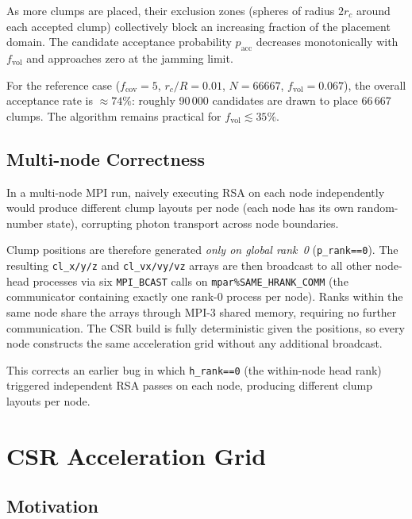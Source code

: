 \documentclass[english,a4paper]{my_memo}
\begin{document}
As more clumps are placed, their exclusion zones (spheres of radius $2r_c$
around each accepted clump) collectively block an increasing fraction of the
placement domain.  The candidate acceptance probability $p_\mathrm{acc}$
decreases monotonically with $f_\mathrm{vol}$ and approaches zero at the
jamming limit.

For the reference case ($f_\mathrm{cov}=5$, $r_c/R=0.01$, $N=66667$,
$f_\mathrm{vol}=0.067$), the overall acceptance rate is $\approx 74\%$:
roughly 90\,000 candidates are drawn to place 66\,667 clumps.  The algorithm
remains practical for $f_\mathrm{vol} \lesssim 35\%$.

\subsection{Multi-node Correctness}

In a multi-node MPI run, naively executing RSA on each node independently
would produce different clump layouts per node (each node has its own
random-number state), corrupting photon transport across node boundaries.

\begin{sloppypar}
Clump positions are therefore generated \emph{only on global rank~0}
(\texttt{p\_rank==0}).  The resulting \texttt{cl\_x/y/z} and
\texttt{cl\_vx/vy/vz} arrays are then broadcast to all other node-head
processes via six \texttt{MPI\_BCAST} calls on
\texttt{mpar\%SAME\_HRANK\_COMM} (the communicator containing exactly one
rank-0 process per node).  Ranks within the same node share the arrays
through MPI-3 shared memory, requiring no further communication.  The CSR
build is fully deterministic given the positions, so every node constructs
the same acceleration grid without any additional broadcast.
\end{sloppypar}

This corrects an earlier bug in which \texttt{h\_rank==0} (the within-node
head rank) triggered independent RSA passes on each node, producing different
clump layouts per node.

\section{CSR Acceleration Grid}

\subsection{Motivation}
\end{document}

